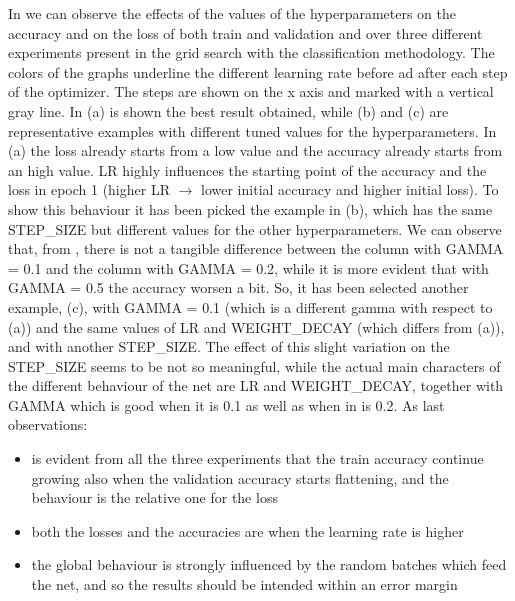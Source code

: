 \documentclass[10pt,twocolumn,hidelinks,letterpaper]{article}
\begin{document}
In  we can observe the effects of the values of the hyperparameters on the accuracy and on the loss of both train and validation and over three different experiments present in the grid search with the classification methodology. The colors of the graphs underline the different learning rate before ad after each step of the optimizer. The steps are shown on the x axis and marked with a vertical gray line. In (a) is shown the best result obtained, while (b) and (c) are representative examples with different tuned values for the hyperparameters. In (a) the loss already starts from a low value and the accuracy already starts from an high value. LR highly influences the starting point of the accuracy and the loss in epoch 1 (higher LR $\rightarrow$ lower initial accuracy and higher initial loss). To show this behaviour it has been picked the example in (b), which has the same STEP\_SIZE but different values for the other hyperparameters. We can observe that, from , there is not a tangible difference between the column with GAMMA = 0.1 and the column with GAMMA = 0.2, while it is more evident that with GAMMA = 0.5 the accuracy worsen a bit. So, it has been selected another example, (c),  with GAMMA = 0.1 (which is a different gamma with respect to (a)) and the same values of LR and WEIGHT\_DECAY (which differs from (a)), and with another STEP\_SIZE. The effect of this slight variation on the STEP\_SIZE seems to be not so meaningful, while the actual main characters of the different behaviour of the net are LR and WEIGHT\_DECAY, together with GAMMA which is good when it is 0.1 as well as when in is 0.2. As last observations:
\begin{itemize}
  \item is evident from all the three experiments that the train accuracy continue growing also when the validation accuracy starts flattening, and the behaviour is the relative one for the loss
  \item both the losses and the accuracies are  when the learning rate is higher
  \item the global behaviour is strongly influenced by the random batches which feed the net, and so the results should be intended within an error margin
\end{itemize}
\end{document}
